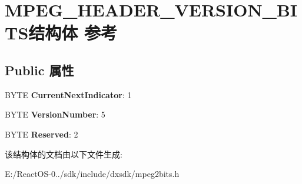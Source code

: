 \hypertarget{struct_m_p_e_g___h_e_a_d_e_r___v_e_r_s_i_o_n___b_i_t_s}{}\section{M\+P\+E\+G\+\_\+\+H\+E\+A\+D\+E\+R\+\_\+\+V\+E\+R\+S\+I\+O\+N\+\_\+\+B\+I\+T\+S结构体 参考}
\label{struct_m_p_e_g___h_e_a_d_e_r___v_e_r_s_i_o_n___b_i_t_s}
\subsection*{Public 属性}
\begin{DoxyCompactItemize}
\item 
\mbox{\label{struct_m_p_e_g___h_e_a_d_e_r___v_e_r_s_i_o_n___b_i_t_s_a888fe71fe6635d29109700e0aadb5999}} 
B\+Y\+TE {\bfseries Current\+Next\+Indicator}\+: 1
\item 
\mbox{\label{struct_m_p_e_g___h_e_a_d_e_r___v_e_r_s_i_o_n___b_i_t_s_a75c455d3f9ab53f7046b0b2bc75151f2}} 
B\+Y\+TE {\bfseries Version\+Number}\+: 5
\item 
\mbox{\label{struct_m_p_e_g___h_e_a_d_e_r___v_e_r_s_i_o_n___b_i_t_s_a9cd1f796958c0f259bf514a0b8c55549}} 
B\+Y\+TE {\bfseries Reserved}\+: 2
\end{DoxyCompactItemize}


该结构体的文档由以下文件生成\+:\begin{DoxyCompactItemize}
\item 
E\+:/\+React\+O\+S-\/0../sdk/include/dxsdk/mpeg2bits.\+h\end{DoxyCompactItemize}
